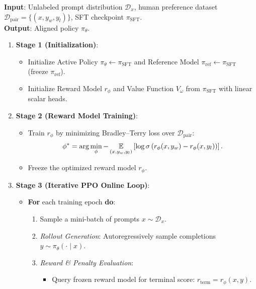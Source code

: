 \documentclass[../../main.tex]{subfiles}
\begin{document}
\begin{tcolorbox}[colback=cardBg,colframe=cardLine,arc=2pt,boxrule=0.5pt,title=\textbf{Algorithmic Pipeline: Complete Execution Workflow of PPO-RLHF}]
\label{box:rlhf_algorithmic_pipeline}
\small\sffamily
\textbf{Input}: Unlabeled prompt distribution $\mathcal{D}_x$, human preference dataset $\mathcal{D}_{\text{pair}} = \{(x, y_w, y_l)\}$, SFT checkpoint $\pi_{\text{SFT}}$.\\
\textbf{Output}: Aligned policy $\pi_\theta$.
\begin{enumerate}
    \item \textbf{Stage 1 (Initialization)}:
    \begin{itemize}
        \item Initialize Active Policy $\pi_\theta \leftarrow \pi_{\text{SFT}}$ and Reference Model $\pi_{\text{ref}} \leftarrow \pi_{\text{SFT}}$ (freeze $\pi_{\text{ref}}$).
        \item Initialize Reward Model $r_\phi$ and Value Function $V_\omega$ from $\pi_{\text{SFT}}$ with linear scalar heads.
    \end{itemize}
    \item \textbf{Stage 2 (Reward Model Training)}:
    \begin{itemize}
        \item Train $r_\phi$ by minimizing Bradley--Terry loss over $\mathcal{D}_{\text{pair}}$:
        $$\phi^* = \arg\min_\phi -\operatorname*{\mathbb{E}}_{(x, y_w, y_l)} \left[ \log \sigma\left( r_\phi(x, y_w) - r_\phi(x, y_l) \right) \right].$$
        \item Freeze the optimized reward model $r_\phi$.
    \end{itemize}
    \item \textbf{Stage 3 (Iterative PPO Online Loop)}:
    \begin{itemize}
        \item \textbf{For} each training epoch \textbf{do}:
        \begin{enumerate}
            \item Sample a mini-batch of prompts $x \sim \mathcal{D}_x$.
            \item \textit{Rollout Generation}: Autoregressively sample completions $y \sim \pi_\theta(\cdot \mid x)$.
            \item \textit{Reward \& Penalty Evaluation}:
            \begin{itemize}
                \item Query frozen reward model for terminal score: $r_{\text{term}} = r_\phi(x, y)$.

\end{itemize}
\end{enumerate}
\end{itemize}
\end{enumerate}
\end{tcolorbox}
\end{document}
